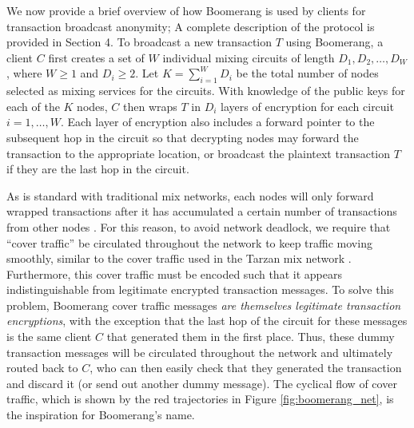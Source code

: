 We now provide a brief overview of how Boomerang is used by clients for transaction broadcast anonymity; A complete description of the protocol is provided in Section 4. To broadcast a new transaction $T$ using Boomerang, a client $C$ first creates a set of $W$ individual mixing circuits of length $D_1,D_2,\dots,D_W$, where $W \geq 1$ and $D_i \geq 2$. Let $K = \sum_{i=1}^WD_i$ be the total number of nodes selected as mixing services for the circuits. With knowledge of the public keys for each of the $K$ nodes, $C$ then wraps $T$ in $D_i$ layers of encryption for each circuit $i = 1,\dots,W$. Each layer of encryption also includes a forward pointer to the subsequent hop in the circuit so that decrypting nodes may forward the transaction to the appropriate location, or broadcast the plaintext transaction $T$ if they are the last hop in the circuit. 

As is standard with traditional mix networks, each nodes will only forward wrapped transactions after it has accumulated a certain number of transactions from other nodes \cite{Chaum81-Mix}. For this reason, to avoid network deadlock, we require that ``cover traffic'' be circulated throughout the network to keep traffic moving smoothly, similar to the cover traffic used in the Tarzan mix network \cite{tarzan}. Furthermore, this cover traffic must be encoded such that it appears indistinguishable from legitimate encrypted transaction messages. To solve this problem, Boomerang cover traffic messages \emph{are themselves legitimate transaction encryptions}, with the exception that the last hop of the circuit for these messages is the same client $C$ that generated them in the first place. Thus, these dummy transaction messages will be circulated throughout the network and ultimately routed back to $C$, who can then easily check that they generated the transaction and discard it (or send out another dummy message). The cyclical flow of cover traffic, which is shown by the red trajectories in Figure \ref{fig:boomerang_net}, is the inspiration for Boomerang's name.

